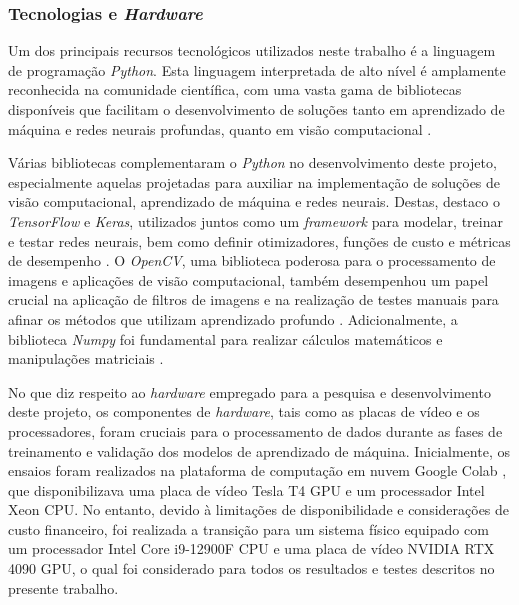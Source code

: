 \subsubsection{Tecnologias e \textit{Hardware}}
\label{project:techard}
Um dos principais recursos tecnológicos utilizados neste trabalho é a linguagem de programação \textit{Python}. Esta linguagem interpretada de alto nível é amplamente reconhecida na comunidade científica, com uma vasta gama de bibliotecas disponíveis que facilitam o desenvolvimento de soluções tanto em aprendizado de máquina e redes neurais profundas, quanto em visão computacional \citep{Millman2011PythonEngineers, Perkel2015Programming:Python}.

Várias bibliotecas complementaram o \textit{Python} no desenvolvimento deste projeto, especialmente aquelas projetadas para auxiliar na implementação de soluções de visão computacional, aprendizado de máquina e redes neurais. Destas, destaco o \textit{TensorFlow} e \textit{Keras}, utilizados juntos como um \textit{framework} para modelar, treinar e testar redes neurais, bem como definir otimizadores, funções de custo e métricas de desempenho \citep{Geron2017Hands-onSystems, Chollet2021DeepPython}. O \textit{OpenCV}, uma biblioteca poderosa para o processamento de imagens e aplicações de visão computacional, também desempenhou um papel crucial na aplicação de filtros de imagens e na realização de testes manuais para afinar os métodos que utilizam aprendizado profundo \citep{Bradski2000TheLibrary.}. Adicionalmente, a biblioteca \textit{Numpy} foi fundamental para realizar cálculos matemáticos e manipulações matriciais \citep{Oliphant2007PythonComputing, VanDerWalt2011TheComputation}.

No que diz respeito ao \textit{hardware} empregado para a pesquisa e desenvolvimento deste projeto, os componentes de \textit{hardware}, tais como as placas de vídeo e os processadores, foram cruciais para o processamento de dados durante as fases de treinamento e validação dos modelos de aprendizado de máquina. Inicialmente, os ensaios foram realizados na plataforma de computação em nuvem Google Colab \citep{Bisong2019GoogleColaboratory}, que disponibilizava uma placa de vídeo Tesla T4 GPU e um processador Intel Xeon CPU. No entanto, devido à limitações de disponibilidade e considerações de custo financeiro, foi realizada a transição para um sistema físico equipado com um processador Intel Core i9-12900F CPU e uma placa de vídeo NVIDIA RTX 4090 GPU, o qual foi considerado para todos os resultados e testes descritos no presente trabalho.

